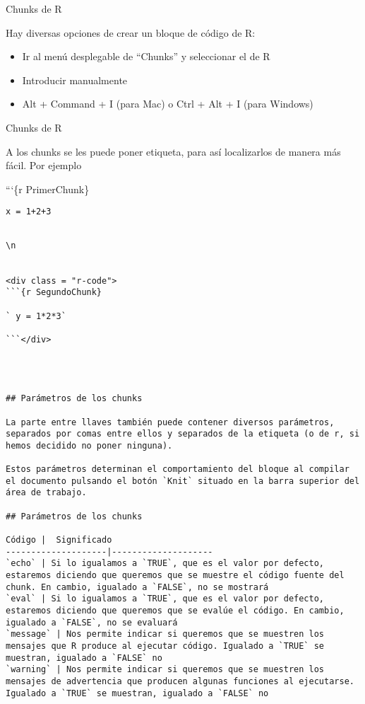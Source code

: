 \documentclass[
  ignorenonframetext,
]{beamer}
\providecommand{\tightlist}{%
  \setlength{\itemsep}{0pt}\setlength{\parskip}{0pt}}
\begin{document}
\begin{frame}{Chunks de R}
\protect\hypertarget{chunks-de-r-1}{}

Hay diversas opciones de crear un bloque de código de R:

\begin{itemize}
\tightlist
\item
  Ir al menú desplegable de ``Chunks'' y seleccionar el de R
\item
  Introducir manualmente
\item
  Alt + Command + I (para Mac) o Ctrl + Alt + I (para Windows)
\end{itemize}

\end{frame}

\begin{frame}[fragile]{Chunks de R}
\protect\hypertarget{chunks-de-r-2}{}

A los chunks se les puede poner etiqueta, para así localizarlos de
manera más fácil. Por ejemplo

```\{r PrimerChunk\}

\texttt{x\ =\ 1+2+3}

\begin{verbatim}

\n


<div class = "r-code">
```{r SegundoChunk}

` y = 1*2*3`

```</div>




## Parámetros de los chunks

La parte entre llaves también puede contener diversos parámetros, separados por comas entre ellos y separados de la etiqueta (o de r, si hemos decidido no poner ninguna).

Estos parámetros determinan el comportamiento del bloque al compilar el documento pulsando el botón `Knit` situado en la barra superior del área de trabajo.

## Parámetros de los chunks

Código |  Significado                                  
--------------------|--------------------
`echo` | Si lo igualamos a `TRUE`, que es el valor por defecto, estaremos diciendo que queremos que se muestre el código fuente del chunk. En cambio, igualado a `FALSE`, no se mostrará
`eval` | Si lo igualamos a `TRUE`, que es el valor por defecto, estaremos diciendo que queremos que se evalúe el código. En cambio, igualado a `FALSE`, no se evaluará
`message` | Nos permite indicar si queremos que se muestren los mensajes que R produce al ejecutar código. Igualado a `TRUE` se muestran, igualado a `FALSE` no
`warning` | Nos permite indicar si queremos que se muestren los mensajes de advertencia que producen algunas funciones al ejecutarse. Igualado a `TRUE` se muestran, igualado a `FALSE` no


\end{verbatim}
\end{frame}
\end{document}
